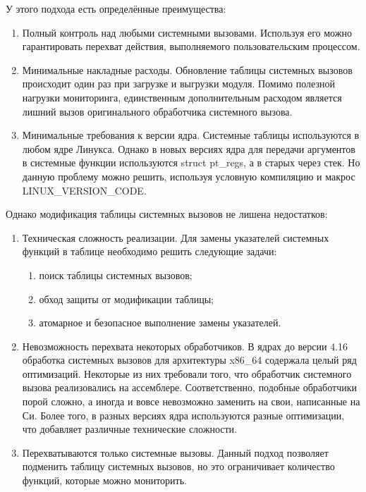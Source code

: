 		У этого подхода есть определённые преимущества:
		\begin{enumerate}
			\item Полный контроль над любыми системными вызовами.
				Используя его можно гарантировать перехват действия,
				выполняемого пользовательским процессом.
			\item Минимальные накладные расходы.
				Обновление таблицы системных вызовов происходит один раз при загрузке и выгрузки модуля.
				Помимо полезной нагрузки мониторинга, единственным дополнительным расходом является лишний вызов 
				оригинального обработчика системного вызова.
			\item Минимальные требования к версии ядра.
				Системные таблицы используются в любом ядре Линукса. 
				Однако в новых версиях ядра для передачи аргументов в системные функции
				используются struct pt\_regs, а в старых через стек. 
				Но данную проблему можно решить, используя условную компиляцию и макрос LINUX\_VERSION\_CODE.
		\end{enumerate}
		
		Однако модификация таблицы системных вызовов не лишена недостатков:
		\begin{enumerate}
			\item Техническая сложность реализации.
				Для замены указателей системных функций в таблице необходимо решить следующие задачи:
				\begin{enumerate}
					\item поиск таблицы системных вызовов;
					\item обход защиты от модификации таблицы;
					\item атомарное и безопасное выполнение замены указателей.
				\end{enumerate}
			
			\item Невозможность перехвата некоторых обработчиков. 
				В ядрах до версии 4.16 обработка системных вызовов для архитектуры x86\_64 содержала целый ряд оптимизаций.
				Некоторые из них требовали того, что обработчик системного вызова реализовались на ассемблере. 
				Соответственно, подобные обработчики порой сложно, а иногда и вовсе невозможно заменить на свои, написанные на Си.
				Более того, в разных версиях ядра используются разные оптимизации, что добавляет различные технические сложности.

			\item Перехватываются только системные вызовы.
				Данный подход позволяет подменить таблицу системных вызовов,
				но это ограничивает количество функций, которые можно мониторить.
		\end{enumerate}
	
